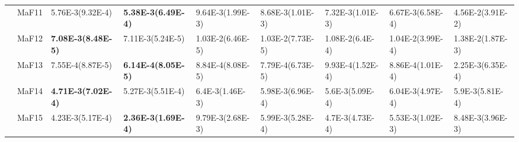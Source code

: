 \documentclass[]{article}
\begin{document}
\begin{landscape}
\begin{table}
\begin{footnotesize}
\begin{tabular}{|l|l|l|l|l|l|l|l|l|}
 & MaF11 & \cellcolor{gray95} 5.76E-3(9.32E-4) & \cellcolor{gray95} {\bf 5.38E-3(6.49E-4)} & 9.64E-3(1.99E-3) & 8.68E-3(1.01E-3) & 7.32E-3(1.01E-3) & \cellcolor{gray95} 6.67E-3(6.58E-4) & 4.56E-2(3.91E-2)\\
 & MaF12 & \cellcolor{gray95} {\bf 7.08E-3(8.48E-5)} & \cellcolor{gray95} 7.11E-3(5.24E-5) & 1.03E-2(6.46E-5) & 1.03E-2(7.73E-5) & 1.08E-2(6.4E-4) & 1.04E-2(3.99E-4) & 1.38E-2(1.87E-3)\\
 & MaF13 & \cellcolor{gray95} 7.55E-4(8.87E-5) & \cellcolor{gray95} {\bf 6.14E-4(8.05E-5)} & 8.84E-4(8.08E-5) & \cellcolor{gray95} 7.79E-4(6.73E-5) & 9.93E-4(1.52E-4) & 8.86E-4(1.01E-4) & 2.25E-3(6.35E-4)\\
 & MaF14 & \cellcolor{gray95} {\bf 4.71E-3(7.02E-4)} & \cellcolor{gray95} 5.27E-3(5.51E-4) & 6.4E-3(1.46E-3) & 5.98E-3(6.96E-4) & 5.6E-3(5.09E-4) & 6.04E-3(4.97E-4) & 5.9E-3(5.81E-4)\\
 & MaF15 & \cellcolor{gray95} 4.23E-3(5.17E-4) & \cellcolor{gray95} {\bf 2.36E-3(1.69E-4)} & 9.79E-3(2.68E-3) & 5.99E-3(5.28E-4) & 4.7E-3(4.73E-4) & 5.53E-3(1.02E-3) & 8.48E-3(3.96E-3)\\
\hline


\end{tabular}
\end{footnotesize}
\end{table}
\end{landscape}
\end{document}
